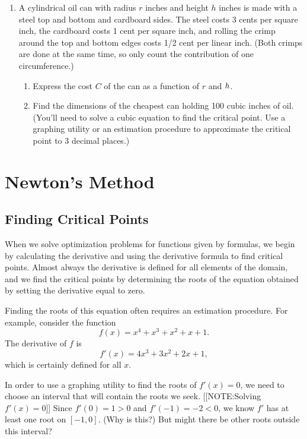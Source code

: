 \begin{enumerate}
\item A cylindrical oil can with radius $r$ inches and height $h$
inches is made with a steel top and bottom and cardboard sides.  The
steel costs 3 cents per square inch, the cardboard costs 1 cent per
square inch, and rolling the crimp around the top and bottom edges
costs 1/2 cent per linear inch.  (Both crimps are done at the same
time, so only count the contribution of one circumference.)  


  \begin{enumerate}
  \item Express the cost $C$ of the can as a function of $r$ and $h\/$.

  \item Find the dimensions of the cheapest can holding 100 cubic inches
of oil.  (You'll need to solve a cubic equation to find the critical
point.  Use a graphing utility or an estimation procedure to
approximate the critical point to 3 decimal places.)


\end{enumerate}
\end{enumerate}
\section{Newton's Method}
\label{sec:newtons-method}

\subsection{Finding Critical Points}
\label{subsec:finding-critical-points}

When we solve optimization problems for functions given by formulas,
we begin by calculating the derivative and using the derivative
formula to find critical points.  Almost always the derivative is
defined for all elements of the domain, and we find the critical
points by determining the roots of the equation obtained by setting
the derivative equal to zero.

Finding the roots of this equation often requires an estimation
procedure.  For example, consider the function
\[
f(x) = x^4 + x^3 + x^2 + x + 1.
\]
The derivative of $f$ is
\[
f'(x) = 4x^3 +3x^2 +2x + 1,
\]
which is certainly defined for all $x$.  

In order to use a graphing utility to find the roots of $f'(x)=0$, we
need to choose an interval that will contain the roots we seek.
[[NOTE:Solving $f'(x)=0$]]
Since $f'(0)=1>0$ and $f'(-1) = -2 < 0$, we know $f'$ has at least one
root on $[-1,0]$.  (Why is this?)  But might there be other roots
outside this interval?

